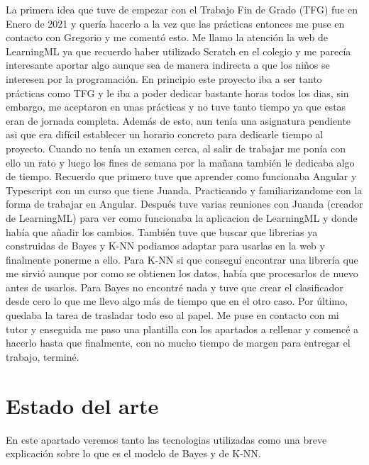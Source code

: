 \documentclass[a4paper, 12pt]{book}
\begin{document}
La primera idea que tuve de empezar con el Trabajo Fin de Grado (TFG) fue en Enero de 2021 y quería hacerlo a la vez que las prácticas entonces me puse en contacto con Gregorio y me comentó esto. Me llamo la atención la web de LearningML ya que recuerdo haber utilizado Scratch en el colegio y me parecía interesante aportar algo aunque sea de manera indirecta a que los niños se interesen por la programación.
En principio este proyecto iba a ser tanto prácticas como TFG y le iba a poder dedicar bastante horas todos los dias, sin embargo, me aceptaron en unas prácticas y no tuve tanto tiempo ya que estas eran de jornada completa. Además de esto, aun tenía una asignatura pendiente asi que era difícil establecer un horario concreto para dedicarle tiempo al proyecto. Cuando no tenía un examen cerca, al salir de trabajar me ponía con ello un rato y luego los fines de semana por la mañana también le dedicaba algo de tiempo. 
Recuerdo que primero tuve que aprender como funcionaba Angular y Typescript con un curso que tiene Juanda. Practicando y familiarizandome con la forma de trabajar en Angular.
Después tuve varias reuniones con Juanda (creador de LearningML) para ver como funcionaba la aplicacion de LearningML y donde había que añadir los cambios.
También tuve que buscar que librerias ya construidas de Bayes y K-NN podiamos adaptar para usarlas en la web y finalmente ponerme a ello. Para K-NN si que conseguí encontrar una librería que me sirvió aunque por como se obtienen los datos, había que procesarlos de nuevo antes de usarlos. Para Bayes no encontré nada y tuve que crear el clasificador desde cero lo que me llevo algo más de tiempo que en el otro caso.
Por último, quedaba la tarea de trasladar todo eso al papel. Me puse en contacto con mi tutor y enseguida me paso una plantilla con los apartados a rellenar y comencé a hacerlo hasta que finalmente, con no mucho tiempo de margen para entregar el trabajo, terminé.



\cleardoublepage
\chapter{Estado del arte}
\label{chap:estado}

En este apartado veremos tanto las tecnologias utilizadas como una breve explicación sobre lo que es el modelo de Bayes y de K-NN.
\end{document}
